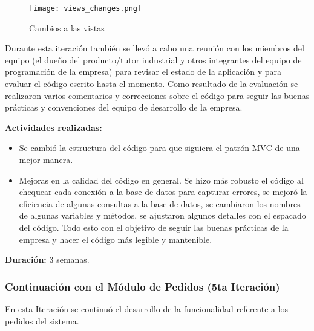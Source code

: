 \begin{figure}[H]
    \centering
    \texttt{[image: views\_changes.png]}
    \caption{Cambios a las vistas}
    \label{fig:views_changes}
\end{figure}

Durante esta iteración también se llevó a cabo una reunión con los miembros del equipo (el dueño del producto/tutor industrial y otros integrantes del equipo de programación de la empresa) para revisar el estado de la aplicación y para evaluar el código escrito hasta el momento. Como resultado de la evaluación se realizaron varios comentarios y correcciones sobre el código para seguir las buenas prácticas y convenciones del equipo de desarrollo de la empresa.

\vspace{0.3cm}
\textbf{Actividades realizadas:}
\begin{itemize}
    \item Se cambió la estructura del código para que siguiera el patrón MVC de una mejor manera.
    \item Mejoras en la calidad del código en general. Se hizo más robusto el código al chequear cada conexión a la base de datos para capturar errores, se mejoró la eficiencia de algunas consultas a la base de datos, se cambiaron los nombres de algunas variables y métodos, se ajustaron algunos detalles con el espacado del código. Todo esto con el objetivo de seguir las buenas prácticas de la empresa y hacer el código más legible y mantenible.
\end{itemize}

\textbf{Duración:} 3 semanas.

\subsubsection{Continuación con el Módulo de Pedidos (5ta Iteración)}
En esta Iteración se continuó el desarrollo de la funcionalidad referente a los pedidos del sistema.

